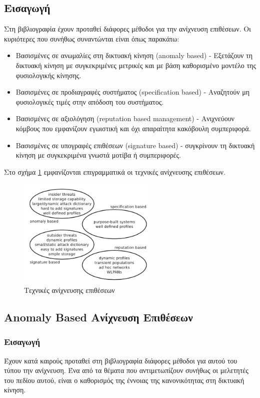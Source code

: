 \documentclass[12pt]{report}
\begin{document}
\subsection{Εισαγωγή}
Στη βιβλιογραφία έχουν προταθεί διάφορες μέθοδοι για την ανίχνευση επιθέσεων. Οι κυριότερες που συνήθως συναντώνται είναι όπως παρακάτω:
\begin{itemize}
  \item Βασισμένες σε ανωμαλίες στη δικτυακή κίνηση (\textlatin{anomaly based}) - Εξετάζουν τη δικτυακή κίνηση με συγκεκριμένες μετρικές και με βάση καθορισμένο μοντέλο της φυσιολογικής κίνησης.
  \item Βασισμένες σε προδιαγραφές συστήματος (\textlatin{specification based}) - Αναζητούν μη φυσιολογικές τιμές στην απόδοση του συστήματος.
  \item Βασισμένες σε αξιολόγηση (\textlatin{reputation based management}) - Ανιχνεύουν κόμβους που εμφανίζουν εγωιστική και όχι απαραίτητα κακόβουλη συμπεριφορά.
  \item Βασισμένες σε υπογραφές επιθέσεων (\textlatin{signature based}) - συγκρίνουν τη δικτυακή κίνηση με συγκεκριμένα γνωστά μοτίβα ή συμπεριφορές.
\end{itemize}
Στο σχήμα \ref{fig:intr-detect} εμφανίζονται επιγραμματικά οι τεχνικές ανίχνευσης επιθέσεων. 
\begin{figure}[ht]
\centering
\includegraphics[width=0.6\textwidth]{intr-detect}
\caption{Τεχνικές ανίχνευσης επιθέσεων}
\label{fig:intr-detect}
\end{figure}

\subsection{\textlatin{Anomaly Based} Ανίχνευση Επιθέσεων}
\subsubsection{Εισαγωγή}
Έχουν κατά καιρούς προταθεί στη βιβλιογραφία διάφορες μέθοδοι για αυτού του τύπου την ανίχνευση. Ένα από τα θέματα που αντιμετωπίζουν συνήθως οι μελετητές του πεδίου αυτού, είναι ο καθορισμός της έννοιας της κανονικότητας στη δικτυακή κίνηση.
\end{document}
